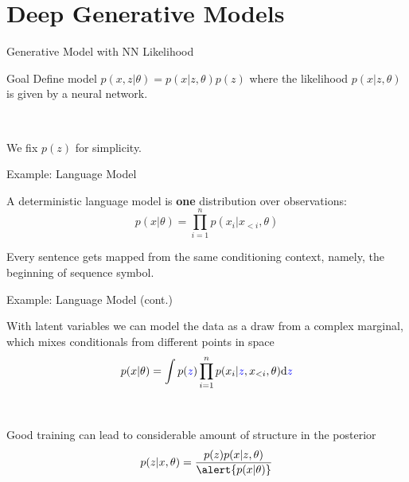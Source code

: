 \section{Deep Generative Models}
\frame{\tableofcontents[currentsection]}


\begin{frame}{Generative Model with NN Likelihood}
\begin{block}{Goal}
Define model $ p(x,z|\theta) = p(x|z,\theta)p(z) $ where the likelihood $ p(x|z,\theta) $ is given by a neural
network. 

~

We fix $ p(z) $ for simplicity.
\end{block}

\end{frame}

\begin{frame}{Example: Language Model}

	A deterministic language model is {\bf one} distribution over observations:
	\begin{equation*}
		p(x|\theta) = \prod_{i=1}^n p(x_i|x_{<i}, \theta)
	\end{equation*}
	
	Every sentence gets mapped from the same conditioning context, namely, the beginning of sequence symbol.


\end{frame}

\begin{frame}{Example: Language Model (cont.)}
	
	With latent variables we can model the data as a draw from a complex marginal, which mixes conditionals from different points in space
	\begin{equation*}
		p(x|\theta) = \int p(\textcolor{blue}{z}) \prod_{i=1}^n p(x_i|\textcolor{blue}{z}, x_{<i}, \theta) \dd \textcolor{blue}{z}
	\end{equation*}
	
	~ \pause
	
	Good training can lead to considerable amount of structure in the posterior
	\begin{equation*}
		p(z|x, \theta) = \frac{p(z)p(x|z, \theta)}{\alert{p(x|\theta)}}
	\end{equation*}

\end{frame}

